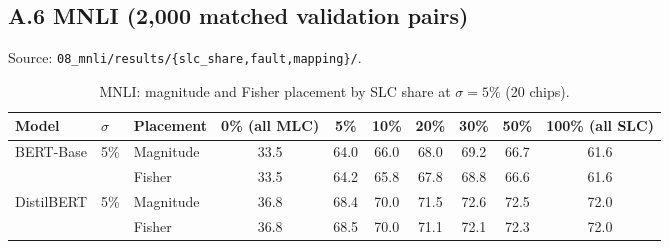 \subsection*{A.6 MNLI (2{,}000 matched validation pairs)}
\noindent Source: \nolinkurl{08_mnli/results/{slc_share,fault,mapping}/}.

\begin{table}[H]
\centering\footnotesize
\caption{MNLI: magnitude and Fisher placement by SLC share at $\sigma=5\%$ (20 chips).}
\begin{tabular}{@{}lllccccccc@{}}
\toprule
Model & $\sigma$ & Placement & 0\% (all MLC) & 5\% & 10\% & 20\% & 30\% & 50\% & 100\% (all SLC) \\
\midrule
\multirow{2}{*}{BERT-Base} & 5\% & Magnitude & 33.5 & 64.0 & 66.0 & 68.0 & 69.2 & 66.7 & 61.6 \\
 &  & Fisher & 33.5 & 64.2 & 65.8 & 67.8 & 68.8 & 66.6 & 61.6 \\
\midrule
\multirow{2}{*}{DistilBERT} & 5\% & Magnitude & 36.8 & 68.4 & 70.0 & 71.5 & 72.6 & 72.5 & 72.0 \\
 &  & Fisher & 36.8 & 68.5 & 70.0 & 71.1 & 72.1 & 72.3 & 72.0 \\
\bottomrule
\end{tabular}
\end{table}

\begin{table}[H]
\centering\footnotesize
\caption{MNLI: magnitude and Fisher placement against stuck cells (20 chips).}
\end{table}

